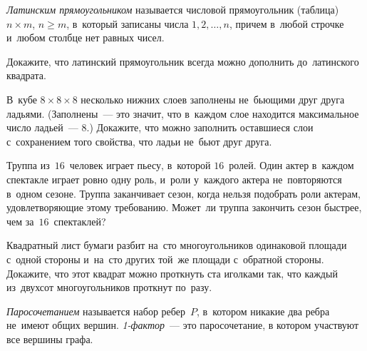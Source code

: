 \emph{Латинским прямоугольником} называется числовой прямоугольник (таблица)
$n \times m$, $n \geq m$, в~который записаны числа $1, 2, \ldots, n$, причем
в~любой строчке и~любом столбце нет равных чисел.

\begin{problems}

\item
Докажите, что латинский прямоугольник всегда можно дополнить до~латинского
квадрата.

\item
В~кубе $8 \times 8 \times 8$ несколько нижних слоев заполнены не~бьющими друг
друга ладьями.
(Заполнены~--- это значит, что в~каждом слое находится максимальное число
ладьей~--- $8$.)
Докажите, что можно заполнить оставшиеся слои с~сохранением того свойства, что
ладьи не~бьют друг друга.

\item
Труппа из~$16$~человек играет пьесу, в~которой $16$~ролей.
Один актер в~каждом спектакле играет ровно одну роль, и~роли у~каждого актера
не~повторяются в~одном сезоне.
Труппа заканчивает сезон, когда нельзя подобрать роли актерам, удовлетворяющие
этому требованию.
Может~ли труппа закончить сезон быстрее, чем за~$16$~спектаклей?

\item
Квадратный лист бумаги разбит на~сто многоугольников одинаковой площади с~одной
стороны и~на~сто других той~же площади с~обратной стороны.
Докажите, что этот квадрат можно проткнуть ста иголками так, что каждый
из~двухсот многоугольников проткнут по~разу.

\end{problems}

\emph{Паросочетанием} называется набор ребер~$P$, в~котором никакие два ребра
не~имеют общих вершин.
\emph{1-фактор}~--- это паросочетание, в котором участвуют все вершины графа.

